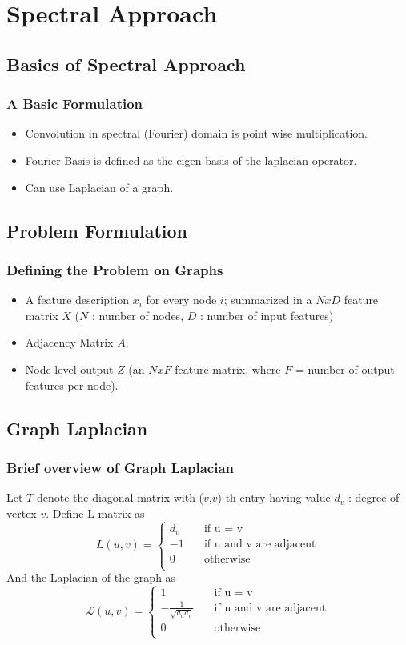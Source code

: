 \documentclass{beamer}
\begin{document}
\section{Spectral Approach}
\subsection{Basics of Spectral Approach}
\begin{frame}
  \frametitle{A Basic Formulation}
  \begin{itemize}
  \item Convolution in spectral (Fourier) domain is point wise multiplication.
  \item Fourier Basis is defined as the eigen basis of the laplacian operator.
  \item Can use Laplacian of a graph.
  \end{itemize}
\end{frame}

\subsection{Problem Formulation}
\begin{frame}
  \frametitle{Defining the Problem on Graphs}
  \begin{itemize}
  \item <1-> A feature description $x_i$ for every node $i$; summarized in a $N x D$ feature matrix $X$ ($N$ : number of nodes, $D$ : number of input features)
  \item <2-> Adjacency Matrix $A$.
  \item <3-> Node level output $Z$ (an $N x F$ feature matrix, where $F$ = number of output features per node).
  \end{itemize}
\end{frame}

\subsection{Graph Laplacian}
\begin{frame}
  \frametitle{Brief overview of Graph Laplacian}
  Let $T$ denote the diagonal matrix with ($v$,$v$)-th entry having value $d_v$ : degree of vertex $v$.
  Define L-matrix as
  \[
    L(u,v) =
    \begin{cases}
      d_v &\quad\text{if u = v}\\
      -1 &\quad\text{if u and v are adjacent}\\
      0 &\quad \text{otherwise}\\
    \end{cases}
  \]
  And the Laplacian of the graph as
  \[
    \mathcal{L}(u,v) =
    \begin{cases}
      1 &\quad\text{if u = v}\\
      -\frac{1}{\sqrt{d_ud_v}} &\quad\text{if u and v are adjacent}\\
      0 &\quad \text{otherwise}\\
    \end{cases}
  \]
\end{frame}
\end{document}
